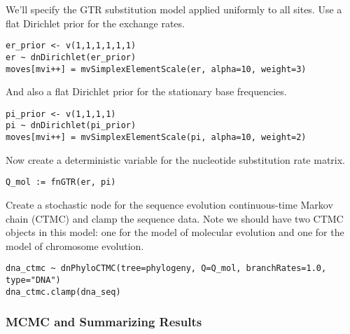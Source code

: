 We'll specify the GTR substitution model applied uniformly to all sites.
Use a flat Dirichlet prior for the exchange rates.
{\tt \begin{snugshade*}
\begin{lstlisting}
er_prior <- v(1,1,1,1,1,1)
er ~ dnDirichlet(er_prior)
moves[mvi++] = mvSimplexElementScale(er, alpha=10, weight=3)
\end{lstlisting}
\end{snugshade*}}
And also a flat Dirichlet prior for the stationary base frequencies.
{\tt \begin{snugshade*}
\begin{lstlisting}
pi_prior <- v(1,1,1,1)
pi ~ dnDirichlet(pi_prior)
moves[mvi++] = mvSimplexElementScale(pi, alpha=10, weight=2)
\end{lstlisting}
\end{snugshade*}}
Now create a deterministic variable for the nucleotide substitution rate matrix.
{\tt \begin{snugshade*}
\begin{lstlisting}
Q_mol := fnGTR(er, pi)
\end{lstlisting}
\end{snugshade*}}
Create a stochastic node for the sequence evolution continuous-time Markov chain (CTMC)
and clamp the sequence data.
Note we should have two CTMC objects in this model: one for the model of molecular evolution
and one for the model of chromosome evolution.
{\tt \begin{snugshade*}
\begin{lstlisting}
dna_ctmc ~ dnPhyloCTMC(tree=phylogeny, Q=Q_mol, branchRates=1.0, type="DNA")
dna_ctmc.clamp(dna_seq)
\end{lstlisting}
\end{snugshade*}}

\subsubsection{MCMC and Summarizing Results}

